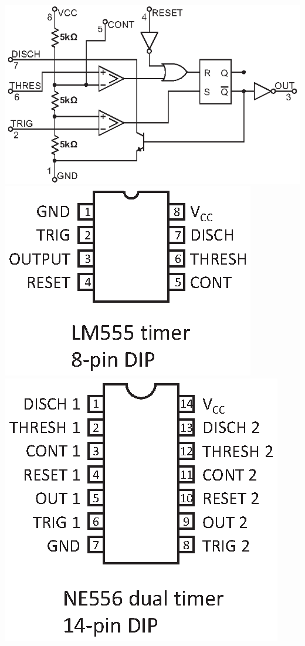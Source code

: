 \medskip
\includegraphics[scale=0.96]{timers/555_block_diagram_multisim.eps}
\hspace{-0.7in}
\hfill
\includegraphics[scale=0.72]{timers/lm555_simple_2line.eps}
\hspace{-0.2in}\includegraphics[scale=0.72]{timers/ne556_abrev_2line.eps}
\hspace{-0.1in}

